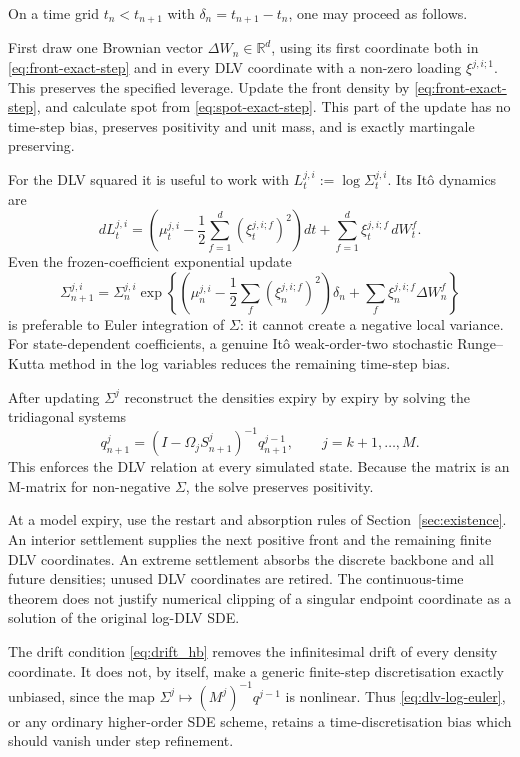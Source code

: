 \documentclass[11pt]{article}
\theoremstyle{plain}
\theoremstyle{definition}
\theoremstyle{remark}
\begin{document}
On a time grid
$t_n<t_{n+1}$ with $\delta_n=t_{n+1}-t_n$, one may proceed as follows.

First draw one Brownian vector $\Delta W_n\in\mathbb R^d$, using its first
coordinate both in \eqref{eq:front-exact-step} and in every DLV coordinate
with a non-zero loading $\xi^{j,i;1}$. This preserves the specified leverage.
Update the front density by \eqref{eq:front-exact-step}, and calculate spot
from \eqref{eq:spot-exact-step}. This part of the update has no time-step
bias, preserves positivity and unit mass, and is exactly martingale
preserving.

For the DLV squared it is useful to work with
$L_t^{j,i}:=\log\Sigma_t^{j,i}$. Its It\^o dynamics are
\[
dL_t^{j,i}
=\left(\mu_t^{j,i}
-\frac12\sum_{f=1}^d(\xi_t^{j,i;f})^2\right)dt
+\sum_{f=1}^d\xi_t^{j,i;f}\,dW_t^f.
\]
Even the frozen-coefficient exponential update
\begin{equation}
\label{eq:dlv-log-euler}
\Sigma_{n+1}^{j,i}
=\Sigma_n^{j,i}\exp\!\left\{
\left(\mu_n^{j,i}
-\frac12\sum_f(\xi_n^{j,i;f})^2\right)\delta_n
+\sum_f\xi_n^{j,i;f}\Delta W_n^f
\right\}
\end{equation}
is preferable to Euler integration of $\Sigma$: it cannot create a negative
local variance. For state-dependent coefficients, a genuine It\^o
weak-order-two stochastic Runge--Kutta method in the log variables reduces
the remaining time-step bias.

After updating $\Sigma^{j}$ reconstruct the densities expiry by expiry by
solving the tridiagonal systems
\begin{equation}
\label{eq:density-algebraic-step}
q_{n+1}^{j}
=\left(I-\Omega_jS_{n+1}^{j}\right)^{-1}q_{n+1}^{j-1},
\qquad j=k+1,\ldots,M.
\end{equation}
This enforces the DLV relation at every simulated state. Because the matrix
is an M-matrix for non-negative $\Sigma$, the solve preserves positivity.

At a model expiry, use the restart and absorption rules of Section~\ref{sec:existence}.
An interior settlement supplies the next positive front and the remaining finite DLV coordinates.
An extreme settlement absorbs the discrete backbone and all future densities; unused
DLV coordinates are retired. The continuous-time theorem does not justify numerical
clipping of a singular endpoint coordinate as a solution of the original log-DLV SDE.

The drift condition \eqref{eq:drift_hb} removes the infinitesimal drift of
every density coordinate. It does not, by itself, make a generic finite-step
discretisation exactly unbiased, since the map
$\Sigma^j\mapsto(M^j)^{-1}q^{j-1}$ is nonlinear. Thus
\eqref{eq:dlv-log-euler}, or any ordinary higher-order SDE scheme, retains a
time-discretisation bias which should vanish under step refinement.
\end{document}
